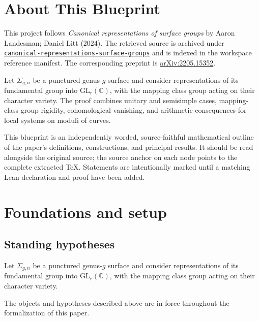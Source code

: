 

\chapter*{About This Blueprint}
\label{canonical-representations-surface-groups-about}

This project follows \emph{Canonical representations of surface groups} by Aaron Landesman; Daniel Litt (2024). The
retrieved source is archived under
\href{../../../../../references/canonical-representations-surface-groups/}{\texttt{canonical-representations-surface-groups}} and is indexed in
the workspace reference manifest. The corresponding preprint is
\href{https://arxiv.org/abs/2205.15352}{arXiv:2205.15352}.

Let $\Sigma_{g,n}$ be a punctured genus-$g$ surface and consider representations of its fundamental group into $\mathrm{GL}_r(\mathbb C)$, with the mapping class group acting on their character variety. The proof combines unitary and semisimple cases, mapping-class-group rigidity, cohomological vanishing, and arithmetic consequences for local systems on moduli of curves.

This blueprint is an independently worded, source-faithful mathematical
outline of the paper's definitions, constructions, and principal results. It
should be read alongside the original source; the source anchor on each node
points to the complete extracted TeX. Statements are intentionally marked
\notready until a matching Lean declaration and proof have been added.

\chapter{Foundations and setup}
\label{chap:canonical-representations-surface-groups-foundations}

\section{Standing hypotheses}
\label{sec:canonical-representations-surface-groups-standing}

Let $\Sigma_{g,n}$ be a punctured genus-$g$ surface and consider representations of its fundamental group into $\mathrm{GL}_r(\mathbb C)$, with the mapping class group acting on their character variety.

\begin{convention}
\label{canonical-representations-surface-groups-setup}
The objects and hypotheses described above are in force throughout the
formalization of this paper.
\notready
\end{convention}

